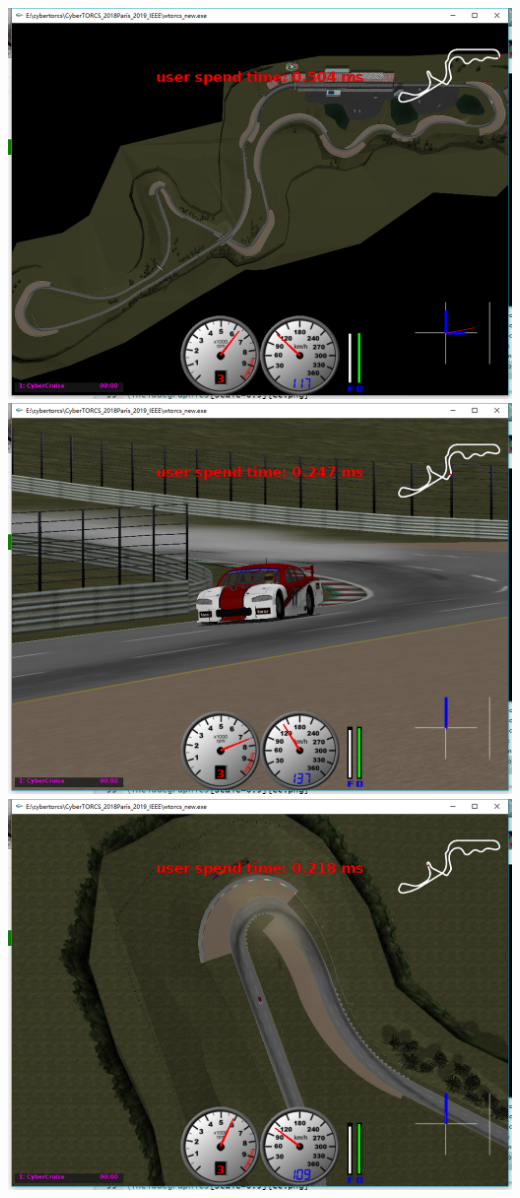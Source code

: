 \documentclass[12pt]{report}
\begin{document}
\newline
\includegraphics[scale=0.3]{t3.png}
\newline
\includegraphics[scale=0.3]{t4.png}
\newline
\includegraphics[scale=0.3]{t5.png}
\end{document}
